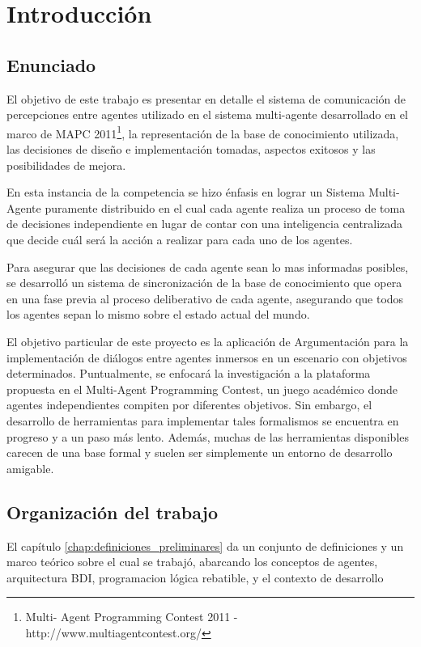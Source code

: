 \chapter{Introducción}
\label{chap:introduccion}

\section{Enunciado}
\label{sec:enunciado}

El objetivo de este trabajo es presentar en detalle el sistema de
comunicación de percepciones entre agentes utilizado en el sistema
multi-agente desarrollado en el marco de MAPC 2011\footnote{Multi-
Agent Programming Contest 2011 - http://www.multiagentcontest.org/},
la representación de la base de conocimiento utilizada, las decisiones
de diseño e implementación tomadas, aspectos exitosos y las
posibilidades de mejora.

En esta instancia de la competencia se hizo énfasis en lograr un
Sistema Multi-Agente puramente distribuido en el cual cada agente
realiza un proceso de toma de decisiones independiente en lugar de
contar con una inteligencia centralizada que decide cuál será la
acción a realizar para cada uno de los agentes. 

Para asegurar que las decisiones de cada agente sean lo mas informadas
posibles, se desarrolló un sistema de sincronización de la base de
conocimiento que opera en una fase previa al proceso deliberativo de
cada agente, asegurando que todos los agentes sepan lo mismo sobre el
estado actual del mundo.

El objetivo particular de este proyecto es la aplicación de
Argumentación para la implementación de diálogos entre agentes
inmersos en un escenario con objetivos determinados.
Puntualmente, se enfocará la investigación a la plataforma propuesta
en el Multi-Agent Programming Contest, un juego académico donde
agentes independientes compiten por diferentes objetivos.
Sin embargo, el desarrollo de herramientas para implementar tales
formalismos se encuentra en progreso y a un paso más lento.
Además, muchas de las herramientas disponibles carecen de una base
formal y suelen ser simplemente un entorno de desarrollo amigable.

\section{Organización del trabajo}
\label{sec:organizacion_del_trabajo}

El capítulo \ref{chap:definiciones_preliminares} da un conjunto de
definiciones y un marco teórico sobre el cual se trabajó, abarcando
los conceptos de agentes, arquitectura BDI, programacion lógica
rebatible, y el contexto de desarrollo

